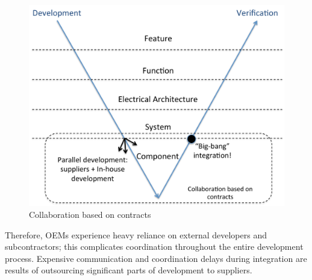 \begin{figure}[htb]
\vspace{-.2cm}
\centering
\includegraphics[width=\columnwidth]{figure/Closed-contract-collaboration.pdf}
\vspace{-.2cm}
\caption{Collaboration based on contracts}
\label{fig:closedContractCollaboration}
\vspace{-.2cm}
\end{figure}

Therefore, OEMs experience heavy reliance on external developers and subcontractors; this complicates coordination throughout the entire development process. Expensive communication and coordination delays during integration are results of outsourcing significant parts of development to suppliers. %

